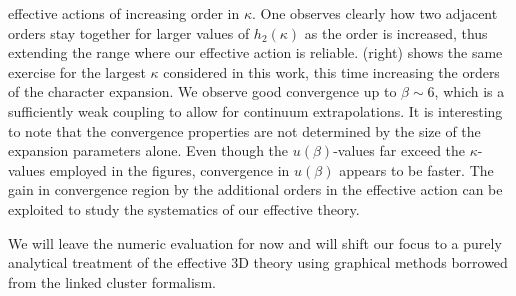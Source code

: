 effective actions of increasing order in $\kappa$. One observes clearly how two
adjacent orders stay together for larger values of $h_2(\kappa)$ as the order is
increased, thus extending the range where our effective action is reliable.
 (right) shows the same exercise for the
largest $\kappa$ considered in this work, this time increasing the orders of the
character expansion. We observe good convergence up to $\beta\sim 6$, which is a
sufficiently weak coupling to allow for continuum extrapolations. It is
interesting to note that the convergence properties are not determined by the
size of the expansion parameters alone.  Even though the $u(\beta)$-values far
exceed the $\kappa$-values employed in the figures, convergence in $u(\beta)$
appears to be faster.  The gain in convergence region by the additional orders
in the effective action can be exploited to study the systematics of our
effective theory.

We will leave the numeric evaluation for now and will shift our focus to a
purely analytical treatment of the effective 3D theory using graphical methods
borrowed from the linked cluster formalism.

